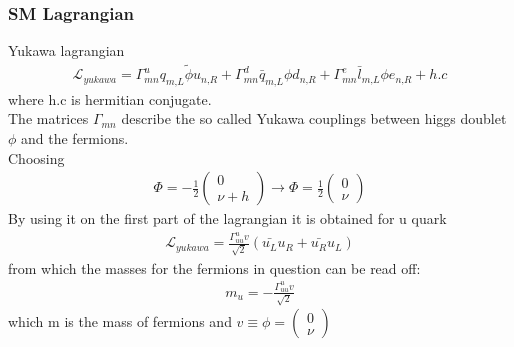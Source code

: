 \documentclass[11pt]{beamer}
\begin{document}
\begin{frame}
\frametitle{SM Lagrangian}
Yukawa lagrangian
\begin{align}
\mathcal{L}_{yukawa}=\Gamma^u_{mn}q_{m\text{,}L} \tilde{\phi} u_{n\text{,}R}+\Gamma^d_{mn}\bar{q}_{m\text{,}L} \phi d_{n\text{,}R}+\Gamma^e_{mn}\bar{l}_{m\text{,}L} \phi e_{n\text{,}R}+h.c
\end{align}
\scriptsize{where h.c is hermitian conjugate. %
\\
The matrices $\Gamma_{mn}$ describe the so called Yukawa couplings between higgs doublet $\phi$ and the fermions.\\
Choosing}
\begin{align*}
\Phi=-\frac{1}{2}\left(\begin{array}{c}
0 \\
\nu+h
\end{array} \right) \rightarrow  \Phi=\frac{1}{2}\left(\begin{array}{c}
0 \\
\nu
\end{array} \right) %
\end{align*}
\scriptsize{
By using it on the first part of 
the lagrangian it is obtained for u quark} 
\begin{align*}
\mathcal{L}_{yukawa}=\frac{\Gamma^u_{uu}v}{\sqrt{2}}(\bar{u_L}u_R+\bar{u_R}u_L)
\end{align*}
\scriptsize{
from which the masses for the fermions in question can be read off:}
\begin{align*}
m_u=-\frac{\Gamma^u_{uu}v}{\sqrt{2}}
\end{align*}
which m is the mass of fermions and $v\equiv \phi= \left(\begin{array}{c}
0\\
\nu
\end{array}\right)$
\end{frame}
\end{document}
